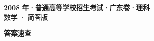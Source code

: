 \documentclass[zihao=-4, a4paper]{ctexart}
\begin{document}
\begin{center}
  {\Large\bfseries 2008 年·普通高等学校招生考试·广东卷·理科}\\[4pt]
  {\large 数学 · 简答版}
\end{center}
\medskip
{}

\clearpage
{}
\begin{center}{\Large\bfseries 答案速查}\end{center}
\medskip

\end{document}
